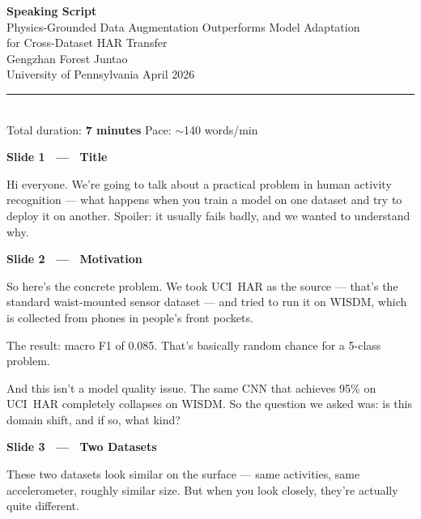 \documentclass[12pt]{article}
\newcommand{\slidetitle}[1]{%
  \vspace{14pt}%
  \noindent\colorbox{pennblue}{\parbox{\dimexpr\textwidth-2\fboxsep\relax}{%
    \strut\bfseries\color{white}\quad #1\strut}}%
  \vspace{4pt}\par
}
\newcommand{\timing}[1]{%
  \noindent{\small\bfseries\color{pennred}#1}\quad\par\vspace{2pt}%
}
\begin{document}
\begin{center}
  {\LARGE\bfseries\color{pennblue} Speaking Script}\\[4pt]
  {\large Physics-Grounded Data Augmentation Outperforms Model Adaptation\\
  for Cross-Dataset HAR Transfer}\\[8pt]
  {\normalsize Gengzhan \quad Forest \quad Juntao\\
  University of Pennsylvania \quad April 2026}\\[4pt]
  \textcolor{pennred}{\rule{\textwidth}{1.5pt}}\\[2pt]
  {\small Total duration: \textbf{7 minutes} \quad Pace: $\sim$140 words/min}
\end{center}

\vspace{6pt}

\slidetitle{Slide 1 \ — \ Title}
\timing{[0:00 – 0:15]}

Hi everyone. We're going to talk about a practical problem in human activity
recognition --- what happens when you train a model on one dataset and try to
deploy it on another. Spoiler: it usually fails badly, and we wanted to understand why.

\slidetitle{Slide 2 \ — \ Motivation}
\timing{[0:15 – 1:00]}

So here's the concrete problem. We took UCI~HAR as the source --- that's
the standard waist-mounted sensor dataset --- and tried to run it on WISDM,
which is collected from phones in people's front pockets.

The result: macro F1 of 0.085. That's basically random chance for a 5-class problem.

And this isn't a model quality issue. The same CNN that achieves 95\% on
UCI~HAR completely collapses on WISDM. So the question we asked was:
is this domain shift, and if so, what kind?

\slidetitle{Slide 3 \ — \ Two Datasets}
\timing{[1:00 – 1:30]}

These two datasets look similar on the surface --- same activities, same
accelerometer, roughly similar size. But when you look closely, they're actually
quite different.
\end{document}
